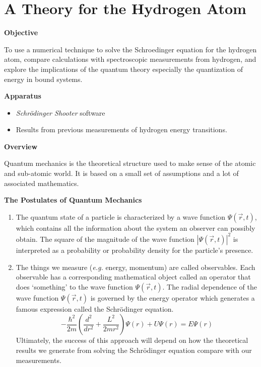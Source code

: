 \setcounter{equation}{0}
\setcounter{figure}{0}

\section{A Theory for the Hydrogen Atom}

\makelabheader %

\textbf{Objective}

To use a numerical technique to solve the Schroedinger equation for the hydrogen atom,
compare calculations with spectroscopic measurements from hydrogen,
 and explore
the implications of the quantum theory especially the quantization of energy
in bound systems.

\textbf{Apparatus}

\begin{itemize}

\item {\it Schr\"odinger Shooter} software

\item Results from previous measurements of hydrogen energy transitions.

\end{itemize}

\textbf{Overview}

Quantum mechanics is the theoretical structure used to make sense of the atomic and sub-atomic
world. 
It is based on a small set of assumptions and a lot of associated mathematics.

\begin{center}
\bf The Postulates of Quantum Mechanics
\end{center}

\begin{enumerate}

\item The quantum state of a particle is characterized by a wave function  
$\Psi(\vec r,t)$, which contains all the information about the system an observer can 
possibly obtain.
The square of the magnitude of the wave function $|\Psi (\vec r,t)|^2$ 
is interpreted as a probability or probability density for the particle's presence. 

\item The things we measure ({\it e.g.} energy, momentum) are called observables. 
Each observable has a corresponding mathematical object called an operator 
that does `something' to the wave function $\Psi(\vec r,t)$.
The radial dependence of the wave function $\Psi(\vec r,t)$ is governed by
the energy operator which generates a famous expression called the
Schr\"odinger equation.
\begin{equation}
-\frac{\hbar^2}{2 m}\left ( \frac{d^2}{d r^2} +  
   \frac{L^2}{2 m r^2} \right ) \Psi(r) + U \Psi(r) = E  \Psi(r)
\end{equation}
Ultimately, the success of this approach will depend on how the theoretical
results we generate from solving the Schr\"odinger equation compare with
our measurements.

\end{enumerate}

